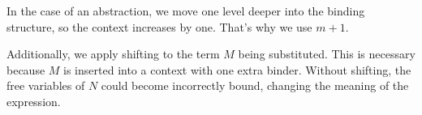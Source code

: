 In the case of an abstraction, we move one level deeper into the binding structure, so the context increases by one. That's why we use \(m + 1\).

Additionally, we apply shifting to the term \(M\) being substituted. This is necessary because \( M \) is inserted into a context with one extra binder. Without shifting, the free variables of \(N\) could become incorrectly bound, changing the meaning of the expression.
